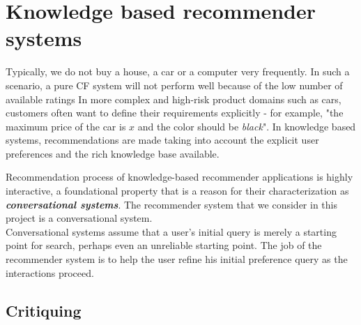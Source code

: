 \section{Knowledge based recommender systems}
Typically, we do not buy a house, a car or a computer very frequently. In such a scenario, a pure CF system will not perform well because of the low number of available ratings
In more complex and high-risk product domains such as cars, customers often want to define their requirements explicitly - for example, "the maximum price of the car is $x$ and the color should be \textit{black}". In knowledge based systems, recommendations are made taking into account the explicit user preferences and the rich knowledge base available.

Recommendation process of knowledge-based recommender applications is highly interactive, a foundational property that is a reason for their characterization as \textit{\textbf{conversational systems}}. The recommender system that we consider in this project is a conversational system.\\
Conversational systems assume that a user's initial query is merely a starting point for search, perhaps even an unreliable starting point. The job of the recommender system is to help the user refine his initial preference query as the interactions proceed.

\subsection{Critiquing}

